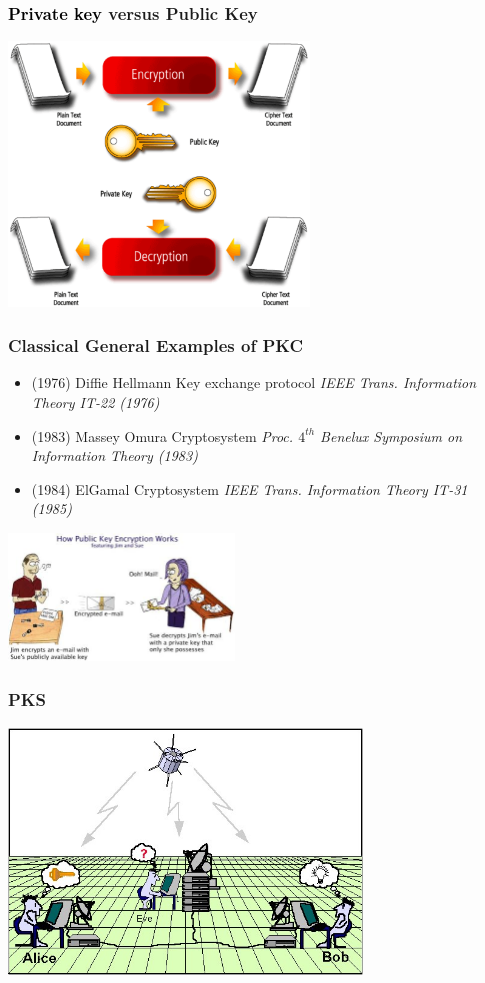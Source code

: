 \documentclass[10pt,handout]{beamer} %
\theoremstyle{definition}
\begin{document}
\begin{frame}
\frametitle{\textcolor{black}{\textbf{Private key}} versus \alert{Public Key}
}\pause\medskip

\centerline{\includegraphics[width=8cm]{images/figure3.pdf}}

\end{frame}


\begin{frame}
\frametitle{Classical General Examples of PKC}\bigskip

\begin{itemize}
  \item[\textcolor{blue}{\ding{182}}] {(1976) Diffie Hellmann Key exchange protocol}
   {\emph{IEEE Trans. Information Theory IT-22 (1976)}}
  \item[\textcolor{blue}{\ding{183}}]  {(1983) Massey Omura Cryptosystem}
{\emph{Proc. $4^{th}$ Benelux Symposium on Information Theory (1983)}}
  \item[\textcolor{blue}{\ding{184}}]  {(1984) ElGamal Cryptosystem}
  {\emph{IEEE Trans. Information Theory IT-31 (1985)}}
\end{itemize}\pause

\centerline{\includegraphics[width=6cm]{images/image033.jpg}}
\end{frame}


\begin{frame}
\frametitle{PKS}

\centerline{\includegraphics[width=9.4cm]{images/Satellite.jpg}}

\end{frame}
\end{document}
